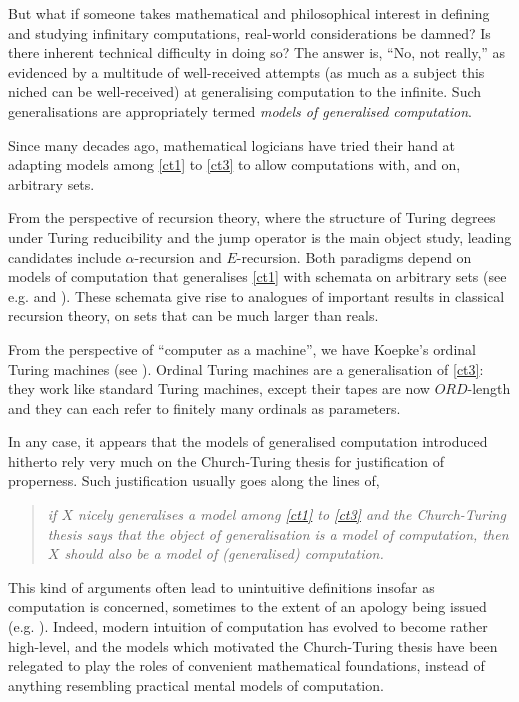 \documentclass[12pt, twoside]{memoir}
\numberwithin{equation}{section}
\theoremstyle{definition}
\theoremstyle{remark}
\theoremstyle{definition}
\theoremstyle{definition}
\theoremstyle{definition}
\theoremstyle{remark}
\begin{document}
But what if someone takes mathematical and philosophical interest in defining and studying infinitary computations, real-world considerations be damned? Is there inherent technical difficulty in doing so? The answer is, ``No, not really,'' as evidenced by a multitude of well-received attempts (as much as a subject this niched can be well-received) at generalising computation to the infinite. Such generalisations are appropriately termed \textit{models of generalised computation}.

Since many decades ago, mathematical logicians have tried their hand at adapting models among \ref{ct1} to \ref{ct3} to allow computations with, and on, arbitrary sets.

From the perspective of recursion theory, where the structure of Turing degrees under Turing reducibility and the jump operator is the main object study, leading candidates include $\alpha$-recursion and $E$-recursion. Both paradigms depend on models of computation that generalises \ref{ct1} with schemata on arbitrary sets (see e.g. \cite{takeuti} and \cite{normann}). These schemata give rise to analogues of important results in classical recursion theory, on sets that can be much larger than reals. 

From the perspective of ``computer as a machine'', we have Koepke's ordinal Turing machines (see \cite{koepke1}). Ordinal Turing machines are a generalisation of \ref{ct3}: they work like standard Turing machines, except their tapes are now $ORD$-length and they can each refer to finitely many ordinals as parameters. 

In any case, it appears that the models of generalised computation introduced hitherto rely very much on the Church-Turing thesis for justification of properness. Such justification usually goes along the lines of,
\begin{quote}
    \emph{if $X$ nicely generalises a model among \ref{ct1} to \ref{ct3} and the Church-Turing thesis says that the object of generalisation is a model of computation, then $X$ should also be a model of (generalised) computation.}
\end{quote}
This kind of arguments often lead to unintuitive definitions insofar as computation is concerned, sometimes to the extent of an apology being issued (e.g. \cite{sackserec}). Indeed, modern intuition of computation has evolved to become rather high-level, and the models which motivated the Church-Turing thesis have been relegated to play the roles of convenient mathematical foundations, instead of anything resembling practical mental models of computation.
\end{document}
